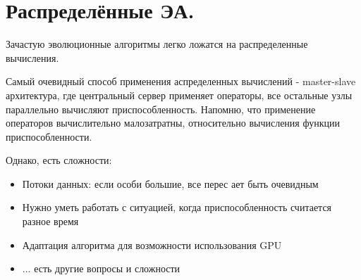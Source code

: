 \section{Распределённые ЭА.}

Зачастую эволюционные алгоритмы легко ложатся на распределенные вычисления. 

Самый очевидный способ применения аспределенных вычислений - master-slave архитектура, где центральный сервер применяет операторы, все остальные узлы параллельно вычисляют приспособленность. Напомню, что применение операторов вычислительно малозатратны, относительно вычисления функции приспособленности.

Однако, есть сложности:
\begin{itemize}
    \item Потоки данных: если особи большие, все перес ает быть очевидным
    \item Нужно уметь работать с ситуацией, когда приспособленность считается разное время
    \item Адаптация алгоритма для возможности использования GPU
    \item ... есть другие вопросы и сложности
\end{itemize}